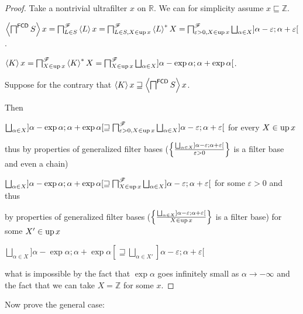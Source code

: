 \begin{proof}
  Take a nontrivial ultrafilter $x$ on $\mathbb{R}$. We can for simplicity
  assume $x \sqsubseteq \mathbb{Z}$.
  
  $\supfun{\bigsqcap^{\mathsf{FCD}} S} x =
  \bigsqcap^{\mathscr{F}}_{L \in S} \supfun{L} x =
  \bigsqcap^{\mathscr{F}}_{L \in S, X \in \up x} \rsupfun{L} X =
  \bigsqcap^{\mathscr{F}}_{\varepsilon > 0, X \in \up
  x} \bigsqcup_{\alpha \in X}] \alpha - \varepsilon ; \alpha + \varepsilon [$.
  
  $\supfun{K} x = \bigsqcap^{\mathscr{F}}_{X \in \up x} \rsupfun{K} X =
  \bigsqcap^{\mathscr{F}}_{X \in \up x}
  \bigsqcup_{\alpha \in X}] \alpha - \exp \alpha ; \alpha + \exp \alpha [$.
  
  Suppose for the contrary that $\left\langle K\right\rangle x \sqsupseteq \left\langle 
  \bigsqcap^{\mathsf{FCD}} S \right\rangle x$.
  
  Then
  
  $\bigsqcup_{\alpha \in X}] \alpha - \exp \alpha ; \alpha + \exp \alpha
  [\sqsupseteq \bigsqcap^{\mathscr{F}}_{\varepsilon > 0, X \in \up x}
  \bigsqcup_{\alpha \in X}] \alpha - \varepsilon ; \alpha + \varepsilon [$ for
  every $X \in \operatorname{up} x$
  
  thus by properties of generalized filter bases ($\setcond{ \bigsqcup_{\alpha
  \in X}] \alpha - \varepsilon ; \alpha + \varepsilon [ }{
  \varepsilon > 0 }$ is a filter base and even a chain)
  
  $\bigsqcup_{\alpha \in X}] \alpha - \exp \alpha ; \alpha + \exp \alpha
  [\sqsupseteq \bigsqcap^{\mathscr{F}}_{X \in \up x} \bigsqcup_{\alpha
  \in X}] \alpha - \varepsilon ; \alpha + \varepsilon [$ for some $\varepsilon
  > 0$ and thus
  
  by properties of generalized filter bases ($\setcond{ \bigsqcup_{\alpha \in
  X}] \alpha - \varepsilon ; \alpha + \varepsilon [ }{
  X \in \up x }$ is a filter base) for some $X' \in \operatorname{up} x$
  
  $\bigsqcup_{\alpha \in X}] \alpha - \exp \alpha ; \alpha + \exp \alpha
  [\sqsupseteq \bigsqcup_{\alpha \in X'}] \alpha - \varepsilon ; \alpha +
  \varepsilon [$
  
  what is impossible by the fact that $\exp \alpha$ goes infinitely small as
  $\alpha \rightarrow - \infty$ and the fact that we can take $X =\mathbb{Z}$
  for some $x$.
\end{proof}

Now prove the general case:


